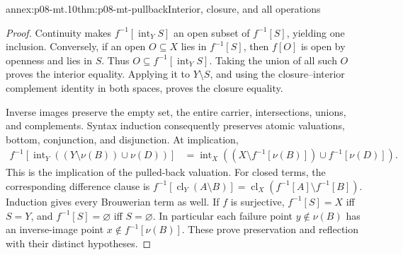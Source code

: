\begin{annexitem}{annex:p08-mt.10}{thm:p08-mt-pullback}{Interior, closure, and all operations}
\begin{proof}
Continuity makes \(f^{-1}[\operatorname{int}_Y S]\) an open subset
of \(f^{-1}[S]\), yielding one inclusion. Conversely, if an open
\(O\subseteq X\) lies in \(f^{-1}[S]\), then \(f[O]\) is open by
openness and lies in \(S\). Thus
\(O\subseteq f^{-1}[\operatorname{int}_Y S]\). Taking the union of
all such \(O\) proves the interior equality. Applying it to
\(Y\setminus S\), and using the closure--interior complement identity
in both spaces, proves the closure equality.

Inverse images preserve the empty set, the entire carrier, intersections,
unions, and complements. Syntax induction consequently preserves
atomic valuations, bottom, conjunction, and disjunction. At implication,
\[
 \begin{split}
 f^{-1}[\operatorname{int}_Y((Y\setminus\nu(B))\cup\nu(D))]
 &=\operatorname{int}_X((X\setminus f^{-1}[\nu(B)])
                      \cup f^{-1}[\nu(D)]).
 \end{split}
\]
This is the implication of the pulled-back valuation. For closed
terms, the corresponding difference clause is
\(f^{-1}[\operatorname{cl}_Y(A\setminus B)]
 =\operatorname{cl}_X(f^{-1}[A]\setminus f^{-1}[B])\).
Induction gives every Brouwerian term as well.
If \(f\) is surjective, \(f^{-1}[S]=X\) iff \(S=Y\), and
\(f^{-1}[S]=\varnothing\) iff \(S=\varnothing\). In particular
each failure point \(y\notin\nu(B)\) has an inverse-image point
\(x\notin f^{-1}[\nu(B)]\). These prove preservation and reflection
with their distinct hypotheses.
\end{proof}
\end{annexitem}

